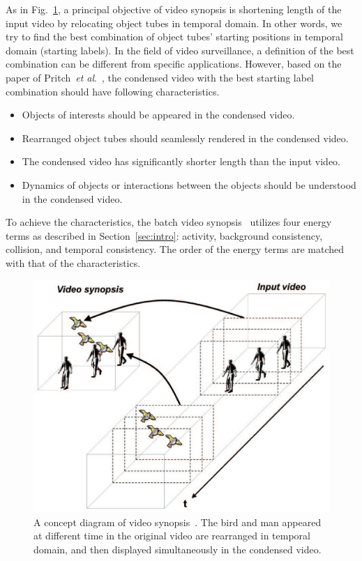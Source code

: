 \documentclass[11pt]{hyu_thesis}
\newcommand{\etal}{\textit{et al}.}
\begin{document}
As in Fig.~\ref{fig:video_synopsis}, a principal objective of video synopsis is shortening length of the input video by relocating object tubes in temporal domain. In other words, we try to find the best combination of object tubes' starting positions in temporal domain (starting labels). In the field of video surveillance, a definition of the best combination can be different from specific applications. However, based on the paper of Pritch~\etal~\cite{Pritch2008}, the condensed video with the best starting label combination should have following characteristics.
\begin{itemize}
\item Objects of interests should be appeared in the condensed video.
\item Rearranged object tubes should seamlessly rendered in the condensed video.
\item The condensed video has significantly shorter length than the input video.
\item Dynamics of objects or interactions between the objects should be understood in the condensed video.
\end{itemize}
To achieve the characteristics, the batch video synopsis~\cite{Pritch2008} utilizes four energy terms as described in Section~\ref{sec:intro}: activity, background consistency, collision, and temporal consistency. The order of the energy terms are matched with that of the characteristics.

\begin{figure}
\begin{center}
\includegraphics[width=\linewidth]{video_synopsis.eps}
\end{center}
\caption{A concept diagram of video synopsis~\cite{Pritch2009}. The bird and man appeared at different time in the original video are rearranged in temporal domain, and then displayed simultaneously in the condensed video.}
\label{fig:video_synopsis}
\end{figure}
\end{document}

